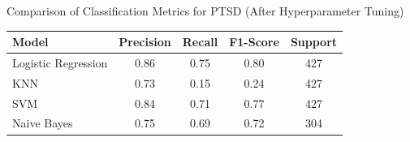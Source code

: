 \begin{center}
\vspace{0.25in}
Comparison of Classification Metrics for PTSD (After Hyperparameter Tuning)
\begin{tabular}{|l|c|c|c|c|}
\hline
\textbf{Model} & \textbf{Precision} & \textbf{Recall} & \textbf{F1-Score} & \textbf{Support} \\ \hline
Logistic Regression & 0.86 & 0.75 & 0.80 & 427 \\ \hline
KNN                & 0.73 & 0.15 & 0.24 & 427 \\ \hline
SVM                & 0.84 & 0.71 & 0.77 & 427 \\ \hline
Naive Bayes        & 0.75 & 0.69 & 0.72 & 304 \\ \hline
\end{tabular}

\end{center}



